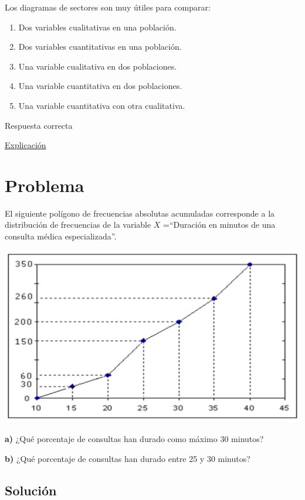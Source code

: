 \documentclass[
]{book}
\providecommand{\tightlist}{%
  \setlength{\itemsep}{0pt}\setlength{\parskip}{0pt}}
\begin{document}
Los diagramas de sectores son muy útiles para comparar:

\begin{enumerate}
\def\labelenumi{\alph{enumi})}
\tightlist
\item
  Dos variables cualitativas en una población.
\item
  Dos variables cuantitativas en una población.
\item
  Una variable cualitativa en dos poblaciones.
\item
  Una variable cuantitativa en dos poblaciones.
\item
  Una variable cuantitativa con otra cualitativa.
\end{enumerate}

Respuesta correcta

\href{https://1fjmanzano.github.io/bioestadistica/diagramas-de-barras-y-sectores.html}{Explicación}

\hypertarget{problema-5}{%
\section{Problema}\label{problema-5}}

El siguiente polígono de frecuencias absolutas acumuladas corresponde a la distribución de frecuencias de la variable \(X\) =``Duración en minutos de una consulta médica especializada''.

\includegraphics[width=19.47in]{img/2_1}

\textbf{a)} ¿Qué porcentaje de consultas han durado como máximo 30 minutos?

\textbf{b)} ¿Qué porcentaje de consultas han durado entre 25 y 30 minutos?

\hypertarget{soluciuxf3n-4}{%
\subsection{Solución}\label{soluciuxf3n-4}}
\end{document}
